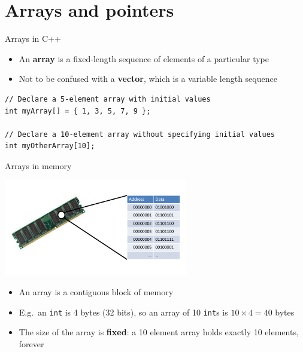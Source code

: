 \part{Arrays and pointers}
\frame{\partpage}

\begin{frame}[fragile]{Arrays in C++}
    \begin{itemize}
        \item An \textbf{array} is a fixed-length sequence of elements of a particular type \pause
        \item Not to be confused with a \textbf{vector}, which is a variable length sequence \pause
    \end{itemize}
    \begin{lstlisting}
// Declare a 5-element array with initial values
int myArray[] = { 1, 3, 5, 7, 9 };

// Declare a 10-element array without specifying initial values
int myOtherArray[10];
    \end{lstlisting}
\end{frame}

\begin{frame}[fragile]{Arrays in memory}
    \begin{center}
        \includegraphics[width=0.6\textwidth]{memory.pdf}
    \end{center} \pause
    \begin{itemize}
        \item An array is a contiguous block of memory \pause
        \item E.g.\ an \lstinline{int} is 4 bytes (32 bits), so an array of 10 \lstinline{int}s is $10 \times 4 = 40$ bytes \pause
        \item The size of the array is \textbf{fixed}: a 10 element array holds exactly 10 elements, forever
    \end{itemize}
\end{frame}

